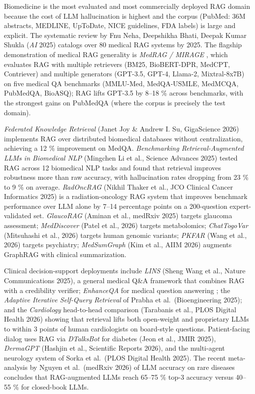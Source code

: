 \documentclass{article}
\begin{document}
Biomedicine is the most evaluated and most commercially deployed RAG domain because the cost of LLM hallucination is highest and the corpus (PubMed: 36M abstracts, MEDLINE, UpToDate, NICE guidelines, FDA labels) is large and explicit. The systematic review by Fnu Neha, Deepshikha Bhati, Deepak Kumar Shukla (\emph{AI} 2025) catalogs over 80 medical RAG systems by 2025. The flagship demonstration of medical RAG generality is \emph{MedRAG / MIRAGE} \citep{xiong2024benchmarkingretrie}, which evaluates RAG with multiple retrievers (BM25, BioBERT-DPR, MedCPT, Contriever) and multiple generators (GPT-3.5, GPT-4, Llama-2, Mixtral-8x7B) on five medical QA benchmarks (MMLU-Med, MedQA-USMLE, MedMCQA, PubMedQA, BioASQ); RAG lifts GPT-3.5 by 8--18 \% across benchmarks, with the strongest gains on PubMedQA (where the corpus is precisely the test domain).

\emph{Federated Knowledge Retrieval} (Janet Joy \& Andrew I. Su, GigaScience 2026) implements RAG over distributed biomedical databases without centralization, achieving a 12 \% improvement on MedQA. \emph{Benchmarking Retrieval-Augmented LLMs in Biomedical NLP} (Mingchen Li et al., Science Advances 2025) tested RAG across 12 biomedical NLP tasks and found that retrieval improves robustness more than raw accuracy, with hallucination rates dropping from 23 \% to 9 \% on average. \emph{RadOncRAG} (Nikhil Thaker et al., JCO Clinical Cancer Informatics 2025) is a radiation-oncology RAG system that improves benchmark performance over LLM alone by 7--14 percentage points on a 200-question expert-validated set. \emph{GlaucoRAG} (Aminan et al., medRxiv 2025) targets glaucoma assessment; \emph{MedDiscover} (Patel et al., 2026) targets metabolomics; \emph{ChatTogoVar} (Mitsuhashi et al., 2026) targets human genomic variants; \emph{PKFAR} (Wang et al., 2026) targets psychiatry; \emph{MedSumGraph} (Kim et al., AIIM 2026) augments GraphRAG with clinical summarization.

Clinical decision-support deployments include \emph{LINS} (Sheng Wang et al., Nature Communications 2025), a general medical Q\&A framework that combines RAG with a credibility verifier; \emph{EnhanceQA} for medical question answering \citep{wang20242024}; the \emph{Adaptive Iterative Self-Query Retrieval} of Prabha et al.~(Bioengineering 2025); and the \emph{Cardiology} head-to-head comparison (Tarabanis et al., PLOS Digital Health 2026) showing that retrieval lifts both open-weight and proprietary LLMs to within 3 points of human cardiologists on board-style questions. Patient-facing dialog uses RAG via \emph{DTalksBot} for diabetes (Jeon et al., JMIR 2025), \emph{DermaGPT} (Hashjin et al., Scientific Reports 2026), and the multi-agent neurology system of Sorka et al.~(PLOS Digital Health 2025). The recent meta-analysis by Nguyen et al.~(medRxiv 2026) of LLM accuracy on rare diseases concludes that RAG-augmented LLMs reach 65--75 \% top-3 accuracy versus 40--55 \% for closed-book LLMs.
\end{document}
